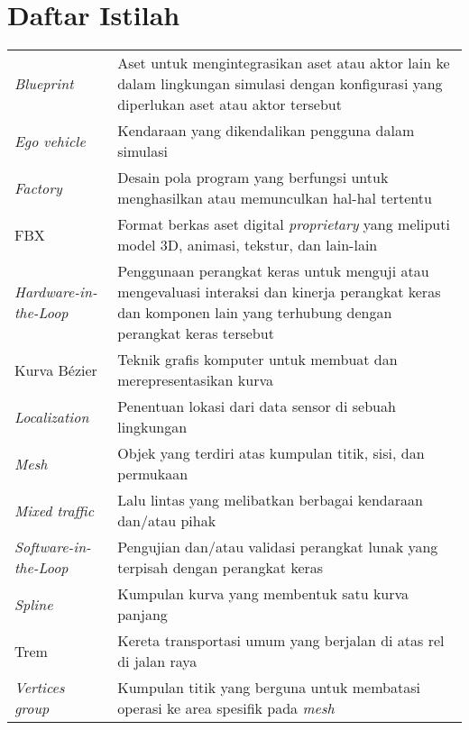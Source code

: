 \chapter*{Daftar Istilah}

\begingroup
\def\arraystretch{1.25}
\begin{onehalfspace}
\begin{longtable}{p{} p{}}

	\textit{Blueprint} & Aset untuk mengintegrasikan aset atau aktor lain ke dalam lingkungan simulasi dengan konfigurasi yang diperlukan aset atau aktor tersebut \\
	\textit{Ego vehicle} & Kendaraan yang dikendalikan pengguna dalam simulasi \\
	\textit{Factory} & Desain pola program yang berfungsi untuk menghasilkan atau memunculkan hal-hal tertentu \\
	FBX & Format berkas aset digital \textit{proprietary} yang meliputi model 3D, animasi, tekstur, dan lain-lain \\
	\textit{Hardware-in-the-Loop} & Penggunaan perangkat keras untuk menguji atau mengevaluasi interaksi dan kinerja perangkat keras dan komponen lain yang terhubung dengan perangkat keras tersebut \\
	Kurva Bézier & Teknik grafis komputer untuk membuat dan merepresentasikan kurva \\
	\textit{Localization} & Penentuan lokasi dari data sensor di sebuah lingkungan \\
	\textit{Mesh} & Objek yang terdiri atas kumpulan titik, sisi, dan permukaan \\
	\textit{Mixed traffic} & Lalu lintas yang melibatkan berbagai kendaraan dan/atau pihak \\
	\textit{Software-in-the-Loop} & Pengujian dan/atau validasi perangkat lunak yang terpisah dengan perangkat keras \\
	\textit{Spline} & Kumpulan kurva yang membentuk satu kurva panjang \\
	Trem & Kereta transportasi umum yang berjalan di atas rel di jalan raya \\
	\textit{Vertices group} & Kumpulan titik yang berguna untuk membatasi operasi ke area spesifik pada \textit{mesh} \\

\end{longtable}
\end{onehalfspace}
\endgroup
\clearpage
